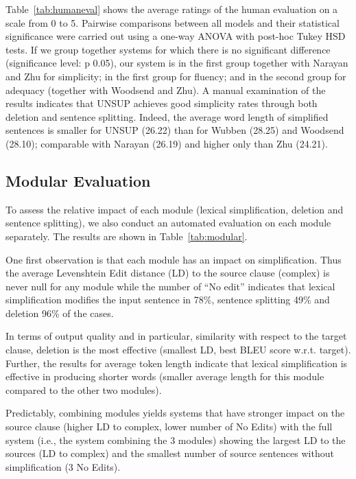 \documentclass[11pt,a4paper]{article}
\begin{document}
Table~\ref{tab:humaneval} shows the average ratings of the human
evaluation on a scale from 0 to 5. Pairwise comparisons between all
models and their statistical significance were carried out using a
one-way ANOVA with post-hoc Tukey HSD tests. If we group together
systems for which there is no significant difference (significance
level: p  0.05), our system is in the first group together with
Narayan and Zhu for simplicity; in the first group for fluency; and in
the second group for adequacy (together with Woodsend and Zhu).  A
manual examination of the results indicates that UNSUP achieves good
simplicity rates through both deletion and sentence splitting. Indeed,
the average word length of simplified sentences is smaller for UNSUP
(26.22) than for Wubben (28.25) and Woodsend (28.10); comparable with
Narayan (26.19) and higher only than Zhu (24.21).

\vspace{-0.05cm}
\subsection{Modular Evaluation}

To assess the relative impact of each module (lexical simplification,
deletion and sentence splitting), we also conduct an automated
evaluation on each module separately. The results are shown in
Table~\ref{tab:modular}.

One first observation is that each module has an impact on
simplification. Thus the average Levenshtein Edit distance (LD) to
the source clause (complex) is never null for any module while the
number of ``No edit'' indicates that lexical simplification modifies
the input sentence in 78\%, sentence splitting 49\% and deletion 96\%
of the cases.  

In terms of output quality and in particular, similarity with respect
to the target clause, deletion is the most effective (smallest LD,
best BLEU score w.r.t. target). Further, the results for average
token length indicate that lexical simplification is effective in
producing shorter words (smaller average length for this
module compared to the other two modules).

Predictably, combining modules yields systems that have stronger
impact on the source clause (higher LD to complex, lower number of No
Edits) with the full system (i.e., the system combining the 3
modules) showing the largest LD to the sources (LD to complex) and the
smallest number of source sentences without simplification (3 No
Edits). 
\end{document}
